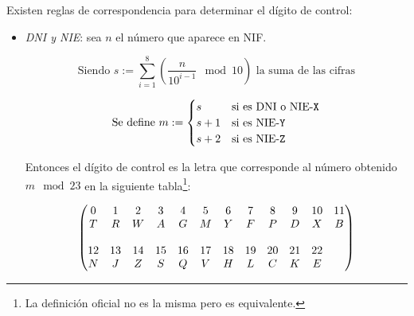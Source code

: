 \documentclass[11pt, a4paper, twoside, titlepage]{article}
\begin{document}
					Existen reglas de correspondencia para determinar el dígito de control:
				\begin{itemize}
					\item {\itshape DNI y NIE}: sea $n$ el número que aparece en NIF.

						\begin{equation*}
							\text{Siendo } s := \sum_{i=1}^8 \left( \frac{n}{10^{i-1}} \mod 10 \right) \text{ la suma de las cifras}
						\end{equation*}

						\begin{equation*}
							\text{Se define } m := 
							\begin{cases}
								s & \text{si es DNI o NIE-{\texttt X}}\\
								s + 1 & \text{si es NIE-{\texttt Y}}\\
								s + 2 & \text{si es NIE-{\texttt Z}}\\
							\end{cases}
						\end{equation*}

						Entonces el dígito de control es la letra que corresponde al número obtenido $m \mod 23$ en la siguiente tabla\footnote{La definición oficial no es la misma pero es equivalente.}: 

						{\small
						\begin{equation*}
							\setcounter{MaxMatrixCols}{12}
							\begin{pmatrix}
								0 & 1 & 2 & 3 & 4 & 5 & 6 & 7 & 8 & 9 & 10 & 11\\
								T & R & W & A & G & M & Y & F & P & D & X  & B  \\
								\\
								12 & 13 & 14 & 15 & 16 & 17 & 18 & 19 & 20 & 21 & 22 &\\
								N  & J  & Z  & S  & Q  & V  & H  & L  & C  & K  & E &\\ 
							\end{pmatrix}
						\end{equation*}
						}


\end{itemize}
\end{document}
